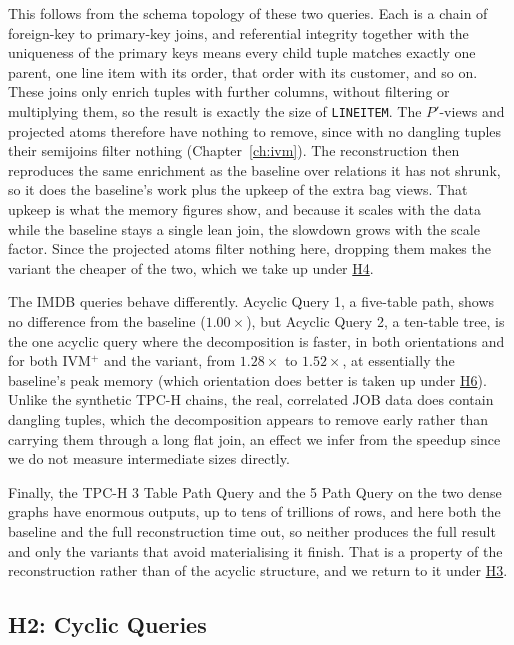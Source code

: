 This follows from the schema topology of these two queries. Each is a chain of foreign-key to primary-key joins, and referential integrity together with the uniqueness of the primary keys means every child tuple matches exactly one parent, one line item with its order, that order with its customer, and so on. These joins only enrich tuples with further columns, without filtering or multiplying them, so the result is exactly the size of \texttt{LINEITEM}. The $P'$-views and projected atoms therefore have nothing to remove, since with no dangling tuples their semijoins filter nothing (Chapter~\ref{ch:ivm}). The reconstruction then reproduces the same enrichment as the baseline over relations it has not shrunk, so it does the baseline's work plus the upkeep of the extra bag views. That upkeep is what the memory figures show, and because it scales with the data while the baseline stays a single lean join, the slowdown grows with the scale factor. Since the projected atoms filter nothing here, dropping them makes the variant the cheaper of the two, which we take up under \hyperlink{h4}{H4}.

The IMDB queries behave differently. Acyclic Query 1, a five-table path, shows no difference from the baseline ($1.00\times$), but Acyclic Query 2, a ten-table tree, is the one acyclic query where the decomposition is faster, in both orientations and for both IVM$^+$ and the variant, from $1.28\times$ to $1.52\times$, at essentially the baseline's peak memory (which orientation does better is taken up under \hyperlink{h6}{H6}). Unlike the synthetic TPC-H chains, the real, correlated JOB data does contain dangling tuples, which the decomposition appears to remove early rather than carrying them through a long flat join, an effect we infer from the speedup since we do not measure intermediate sizes directly.

Finally, the TPC-H 3 Table Path Query and the 5 Path Query on the two dense graphs have enormous outputs, up to tens of trillions of rows, and here both the baseline and the full reconstruction time out, so neither produces the full result and only the variants that avoid materialising it finish. That is a property of the reconstruction rather than of the acyclic structure, and we return to it under \hyperlink{h3}{H3}.

\subsection{H2: Cyclic Queries}
\label{sec:disc_h2}

